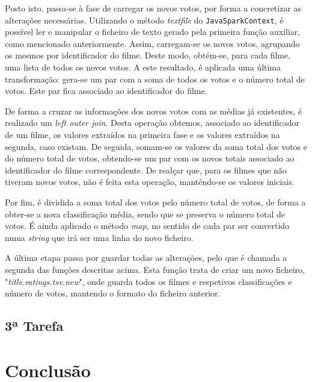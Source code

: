 \documentclass[a4paper]{report}
\begin{document}
            Posto isto, passa-se à fase de carregar os novos votos, por forma a concretizar as alterações necessárias.
            Utilizando o método \textit{textfile} do \texttt{JavaSparkContext}, é possível ler e manipular o ficheiro de texto gerado pela primeira função auxiliar, como mencionado anteriormente.
            Assim, carregam-se os novos votos, agrupando os mesmos por identificador do filme. Deste modo, obtém-se, para cada filme, uma lista de todos os novos votos.
            A este resultado, é aplicada uma última transformação: gera-se um par com a soma de todos os votos e o número total de votos. Este par fica associado ao identificador do filme.

            De forma a cruzar as informações dos novos votos com as médias já existentes, é realizado um \textit{left outer join}.
            Desta operação obtemos, associado ao identificador de um filme, os valores extraídos na primeira fase e os valores extraídos na segunda, caso existam.
            De seguida, somam-se os valores da soma total dos votos e do número total de votos, obtendo-se um par com os novos totais associado ao identificador do filme correspondente.
            De realçar que, para os filmes que não tiveram novos votos, não é feita esta operação, manténdo-se os valores iniciais.

            Por fim, é dividida a soma total dos votos pelo número total de votos, de forma a obter-se a nova classificação média, sendo que se preserva o número total de votos.
            É ainda aplicado o método \textit{map}, no sentido de cada par ser convertido numa \textit{string} que irá ser uma linha do novo ficheiro.

            A última etapa passa por guardar todas as alterações, pelo que é chamada a segunda das funções descritas acima.
            Esta função trata de criar um novo ficheiro, "\textsl{title.ratings.tsv.new}", onde guarda todos os filmes e respetivos classificações e número de votos, mantendo o formato do ficheiro anterior.


    \section{3ª Tarefa} \label{sec:Task3}


\chapter{Conclusão} \label{ch:Conclusion}
\large{
    
}
\end{document}
